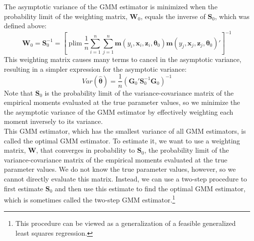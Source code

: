 \documentclass[11pt,letterpaper]{article}
\DeclareMathOperator*{\plim}{plim}
\begin{document}
\noindent The asymptotic variance of the GMM estimator is minimized when the probability limit of the weighting matrix, $\bm{W}_0$, equals the inverse of $\bm{S}_0$, which was defined above:
$$\bm{W}_0 = \bm{S}_0^{-1} = \left[ \plim \frac{1}{n} \sum_{i = 1}^n \sum_{j = 1}^n \bm{m}(y_i, \bm{x}_i, \bm{z}_i, \bm{\theta}_0) \bm{m}(y_j, \bm{x}_j, \bm{z}_j, \bm{\theta}_0)' \right]^{-1}$$
This weighting matrix causes many terms to cancel in the asymptotic variance, resulting in a simpler expression for the asymptotic variance:
$$Var(\widehat{\bm{\theta}}) = \frac{1}{n} (\bm{G}_0' \bm{S}_0^{-1} \bm{G}_0)^{-1}$$
Note that $\bm{S}_0$ is the probability limit of the variance-covariance matrix of the empirical moments evaluated at the true parameter values, so we minimize the the asymptotic variance of the GMM estimator by effectively weighting each moment inversely to its variance. \\

\noindent This GMM estimator, which has the smallest variance of all GMM estimators, is called the optimal GMM estimator. To estimate it, we want to use a weighting matrix, $\bm{W}$, that converges in probability to $\bm{S}_0$, the probability limit of the variance-covariance matrix of the empirical moments evaluated at the true parameter values. We do not know the true parameter values, however, so we cannot directly evaluate this matrix. Instead, we can use a two-step procedure to first estimate $\bm{S}_0$ and then use this estimate to find the optimal GMM estimator, which is sometimes called the two-step GMM estimator.\footnote{This procedure can be viewed as a generalization of a feasible generalized least squares regression.} \\
\end{document}
